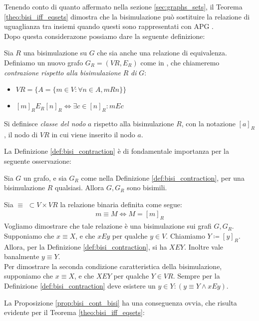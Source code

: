 Tenendo conto di quanto affermato nella sezione \ref{sec:graphs_sets}, il Teorema \ref{theo:bisi_iff_eqsets} dimostra che la bisimulazione può sostituire la
relazione di uguaglianza tra insiemi quando questi sono rappresentati con APG \cite{dovier}.\\
Dopo questa considerazone possiamo dare la seguente definizione:
\begin{definition}
    Sia $R$ una bisimulazione su $G$ che sia anche una relazione di equivalenza. Definiamo un nuovo grafo $G_R = (VR, E_R)$ come in \cite{gentilini}, che chiameremo \emph{contrazione rispetto alla bisimulazione} $R$ \emph{di} $G$:
    \begin{itemize}
        \item $VR = \{A = \{m \in V: \forall n \in A, m R n\}\}$
        \item $[m]_R E_R [n]_R \iff \exists c \in [n]_R : m E c$
    \end{itemize}
    Si definisce \emph{classe del nodo} $a$ rispetto alla bisimulazione $R$, con la notazione $[a]_R$, il nodo di $VR$ in cui viene inserito il nodo $a$.
    \label{def:bisi_contraction}
\end{definition}
La Definizione \ref{def:bisi_contraction} è di fondamentale importanza per la seguente osservazione:
\begin{proposition}
    Sia $G$ un grafo, e sia $G_R$ come nella Definizione \ref{def:bisi_contraction}, per una bisimulazione $R$ qualsiasi. Allora $G, G_R$ sono bisimili.
    \label{prop:bisi_cont_bisi}
\end{proposition}
\begin{proof2}
    Sia $\equiv \,\,\subset V\times VR$ la relazione binaria definita come segue:
    \begin{gather*}
        m \equiv M \iff M = [m]_R
    \end{gather*}
    Vogliamo dimostrare che tale relazione è una bisimulazione sui grafi $G, G_R$.\\
    Supponiamo che $x \equiv X$, e che $x E y$ per qualche $y \in V$. Chiamiamo $Y \coloneqq [y]_R$. Allora, per la Definizione \ref{def:bisi_contraction}, si ha $X E Y$. Inoltre vale banalmente $y \equiv Y$.\\
    Per dimostrare la seconda condizione caratteristica della bisimulazione, supponiamo che $x \equiv X$, e che $X E Y$ per qualche $Y \in VR$. Sempre per la Definizione \ref{def:bisi_contraction} deve esistere un $y \in Y : (y \equiv Y \land x E y)$.
\end{proof2}
La Proposizione \ref{prop:bisi_cont_bisi} ha una conseguenza ovvia, che risulta evidente per il Teorema \ref{theo:bisi_iff_eqsets}:
